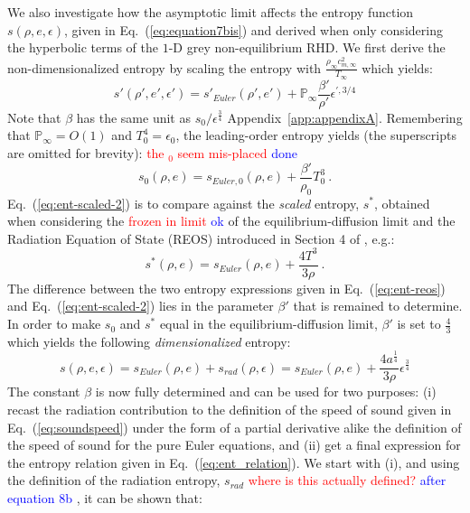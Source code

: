 \documentclass[review]{elsarticle}
\newcommand{\eqt}[1]{Eq.~(\ref{#1})}                     %
\newcommand{\app}[1]{Appendix~\ref{#1}}                     %
\renewcommand{\Re}{\textrm{Re}}
\renewcommand{\Re}{\mathbb{P}_\infty}
\newcommand{\tcr}[1]{\textcolor{red}{#1}}
\newcommand{\tcb}[1]{\textcolor{blue}{#1}}
\begin{document}
We also investigate how the asymptotic limit affects the entropy function $s(\rho, e, \epsilon)$, given in \eqt{eq:equation7bis} and derived when only considering the hyperbolic terms of the $1$-D grey non-equilibrium RHD. We first derive the non-dimensionalized entropy by scaling the entropy with $\frac{\rho_\infty c_{m,\infty}^2}{T_\infty}$ which yields:
%
\begin{equation}\label{eq:ent-scaled}
s' \left( \rho', e', \epsilon' \right) = s'_{Euler} \left( \rho', e' \right)+ \Re\frac{\beta'}{\rho'} \epsilon^{\prime,3/4}
\end{equation}
%
Note that $\beta$ has the same unit as $s_0 / \epsilon^\frac{3}{4}$ \app{app:appendixA}. Remembering that $\Re = O(1)$ and $T_0^4 = \epsilon_0$, the leading-order entropy yields (the superscripts are omitted for brevity):
\tcr{the $_0$ seem mis-placed} \tcb{ done}
%
\begin{equation}\label{eq:ent-scaled-2}
s_0 \left( \rho, e \right) = s_{Euler,0}\left( \rho, e \right) + \frac{\beta'}{\rho_0} T_0^3 \ .
\end{equation}
%
\eqt{eq:ent-scaled-2} is to compare against the \emph{scaled} entropy, $s^*$, obtained when considering the \tcr{frozen in limit} \tcb{ok} of the equilibrium-diffusion limit and the Radiation Equation of State (REOS) introduced in Section 4 of \cite{LowrieMorel}, e.g.:
%
\begin{equation}\label{eq:ent-reos}
s^*(\rho,e) = s_{Euler}(\rho,e) + \frac{4T^3}{3\rho} \ .
\end{equation}
%
The difference between the two entropy expressions given in \eqt{eq:ent-reos} and \eqt{eq:ent-scaled-2} lies in the parameter $\beta'$ that is remained to determine. In order to make $s_0$ and $s^*$ equal in the equilibrium-diffusion limit, $\beta'$ is set to $\frac{4}{3}$ which yields the following \emph{dimensionalized} entropy:
%
\begin{equation}\label{eq:entropy}
s \left( \rho, e, \epsilon \right) = s_{Euler}\left( \rho, e \right) + s_{rad}(\rho,\epsilon)= s_{Euler}\left( \rho, e \right) + \frac{4a^\frac{1}{4}}{3\rho} \epsilon^\frac{3}{4}
\end{equation}
%
The constant $\beta$ is now fully determined and can be used for two purposes: (i) recast the radiation contribution to the definition of the speed of sound given in \eqt{eq:soundspeed} under the form of a partial derivative alike the definition of the speed of sound for the pure Euler equations, and (ii) get a final expression for the entropy relation given in \eqt{eq:ent_relation}. We start with (i), and using the definition of the radiation entropy, $s_{rad} $ \tcr{where is this actually defined?} \tcb{after equation 8b} , it can be shown that:
\end{document}
